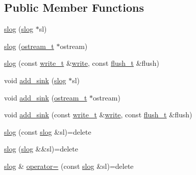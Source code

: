 \subsection*{Public Member Functions}
\begin{DoxyCompactItemize}
\item 
\hyperlink{structdevfix_1_1base_1_1slog_aa27391ee2412df5d659cf98121a8e198}{slog} (\hyperlink{structdevfix_1_1base_1_1slog}{slog} $\ast$sl)
\item 
\hyperlink{structdevfix_1_1base_1_1slog_a240d2ff14130c8a4ab8b25705a08fbe9}{slog} (\hyperlink{structdevfix_1_1base_1_1slog_a3602226e6adc9ea19626e25a0df085a6}{ostream\+\_\+t} $\ast$ostream)
\item 
\hyperlink{structdevfix_1_1base_1_1slog_a13059c5e76ff1647b9a397a868879708}{slog} (const \hyperlink{structdevfix_1_1base_1_1slog_a5897ebe6b65ffd7a1845a6bca989f288}{write\+\_\+t} \&\hyperlink{structdevfix_1_1base_1_1slog_ab9939cb04b4d419ce97687d5823ee79e}{write}, const \hyperlink{structdevfix_1_1base_1_1slog_a5c957ca5d7392786ede9f813ec40fb40}{flush\+\_\+t} \&flush)
\item 
void \hyperlink{structdevfix_1_1base_1_1slog_a4899c65f6f5192f74995be3fffe799bf}{add\+\_\+sink} (\hyperlink{structdevfix_1_1base_1_1slog}{slog} $\ast$sl)
\item 
void \hyperlink{structdevfix_1_1base_1_1slog_ade4230b2bd4b60aeec8935bc8217916e}{add\+\_\+sink} (\hyperlink{structdevfix_1_1base_1_1slog_a3602226e6adc9ea19626e25a0df085a6}{ostream\+\_\+t} $\ast$ostream)
\item 
void \hyperlink{structdevfix_1_1base_1_1slog_a60153602299e16dca17dadc19f218814}{add\+\_\+sink} (const \hyperlink{structdevfix_1_1base_1_1slog_a5897ebe6b65ffd7a1845a6bca989f288}{write\+\_\+t} \&\hyperlink{structdevfix_1_1base_1_1slog_ab9939cb04b4d419ce97687d5823ee79e}{write}, const \hyperlink{structdevfix_1_1base_1_1slog_a5c957ca5d7392786ede9f813ec40fb40}{flush\+\_\+t} \&flush)
\item 
\hyperlink{structdevfix_1_1base_1_1slog_a6518d5f010a788a97ce0b2ea69474b1e}{slog} (const \hyperlink{structdevfix_1_1base_1_1slog}{slog} \&sl)=delete
\item 
\hyperlink{structdevfix_1_1base_1_1slog_af82a828dcb966a06214de6116a9b2f21}{slog} (\hyperlink{structdevfix_1_1base_1_1slog}{slog} \&\&sl)=delete
\item 
\hyperlink{structdevfix_1_1base_1_1slog}{slog} \& \hyperlink{structdevfix_1_1base_1_1slog_aad58f8eb55caedcc390357019b3f2d9f}{operator=} (const \hyperlink{structdevfix_1_1base_1_1slog}{slog} \&sl)=delete

\end{DoxyCompactItemize}
